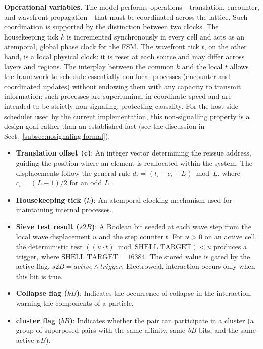 \documentclass{ijuc}
\begin{document}
\medskip\noindent\textbf{Operational variables.}
The model performs operations---translation, encounter, and wavefront propagation---that must be coordinated across the lattice. Such coordination is supported by the distinction between two clocks. The housekeeping tick $k$ is incremented synchronously in every cell and acts as an atemporal, global phase clock for the FSM. The wavefront tick $t$, on the other hand, is a local physical clock: it is reset at each source and may differ across layers and regions. The interplay between the common $k$ and the local $t$ allows the framework to schedule essentially non-local processes (encounter and coordinated updates) without endowing them with any capacity to transmit information: such processes are superluminal in coordinate speed and are intended to be strictly non-signaling, protecting causality.  For the host-side scheduler used by the current implementation, this non-signalling property is a design goal rather than an established fact (see the discussion in Sect.~\ref{subsec:nosignaling-formal}).

\begin{itemize}
\item \textbf{Translation offset ($\mathbf{c}$)}: An integer vector determining the reissue address, guiding the position where an element is reallocated within the system. The displacements follow the general rule $d_i = (t_i - c_i + L) \bmod L$, where $c_i = (L-1)/2$ for an odd $L$.
\item \textbf{Housekeeping tick ($k$)}: An atemporal clocking mechanism used for maintaining internal processes.
\item \textbf{Sieve test result ($s2B$)}: A Boolean bit seeded at each wave step from the local wave displacement $u$ and the step counter $t$. For $u > 0$ on an active cell, the deterministic test $((u \cdot t) \bmod \mathrm{SHELL\_TARGET}) < u$ produces a trigger, where $\mathrm{SHELL\_TARGET} = 16384$. The stored value is gated by the active flag, $s2B = \mathit{active} \land \mathit{trigger}$. Electroweak interaction occurs only when this bit is true.
\item \textbf{Collapse flag ($kB$)}: Indicates the occurrence of collapse in the interaction, warning the components of a particle.
\item \textbf{cluster flag ($bB$)}: Indicates whether the pair can participate in a cluster (a group of superposed pairs with the same affinity, same $bB$ bits, and the same active $pB$).
\end{itemize}
\end{document}
